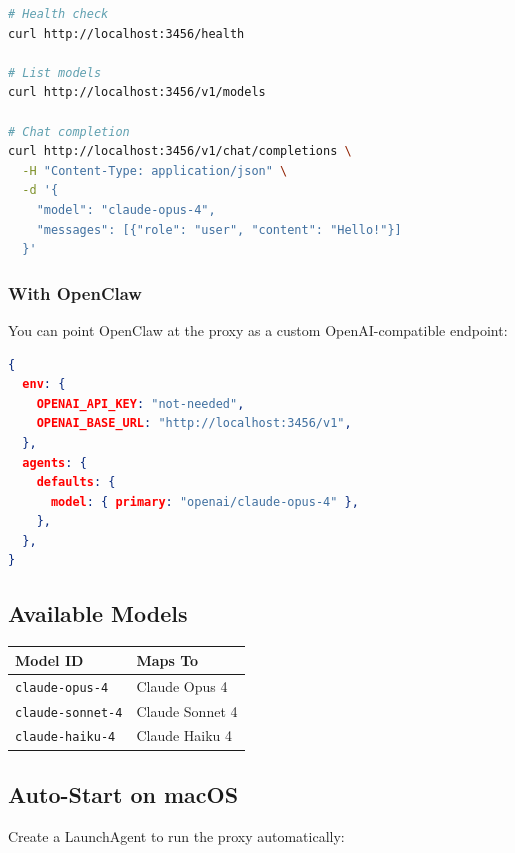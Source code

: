 \begin{lstlisting}[language=bash]
# Health check
curl http://localhost:3456/health

# List models
curl http://localhost:3456/v1/models

# Chat completion
curl http://localhost:3456/v1/chat/completions \
  -H "Content-Type: application/json" \
  -d '{
    "model": "claude-opus-4",
    "messages": [{"role": "user", "content": "Hello!"}]
  }'
\end{lstlisting}


\subsubsection{With OpenClaw}


You can point OpenClaw at the proxy as a custom OpenAI-compatible endpoint:

\begin{lstlisting}[language=json]
{
  env: {
    OPENAI_API_KEY: "not-needed",
    OPENAI_BASE_URL: "http://localhost:3456/v1",
  },
  agents: {
    defaults: {
      model: { primary: "openai/claude-opus-4" },
    },
  },
}
\end{lstlisting}


\subsection{Available Models}



\begin{table}[h]
\centering
\small
\begin{tabular}{|l|l|}
\hline
Model ID & Maps To \\
\hline
\texttt{claude-opus-4} & Claude Opus 4 \\
\hline
\texttt{claude-sonnet-4} & Claude Sonnet 4 \\
\hline
\texttt{claude-haiku-4} & Claude Haiku 4 \\
\hline
\end{tabular}
\end{table}



\subsection{Auto-Start on macOS}


Create a LaunchAgent to run the proxy automatically:

